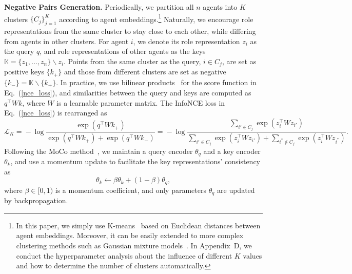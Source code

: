 \documentclass{article} %
\begin{document}
\textbf{Negative Pairs Generation.}
Periodically, we partition all $n$ agents into $K$ clusters $\{C_j\}_{j=1}^K$ according to agent embeddings.\footnote{In this paper, we simply use K-means~\citep{hartigan1979algorithm} based on Euclidean distances between agent embeddings.
Moreover, it can be easily extended to more complex clustering methods such as Gaussian mixture models~\citep{bishop2006pattern}.
In Appendix~D, we conduct the hyperparameter analysis about the influence of different $K$ values and how to determine the number of clusters automatically.}
Naturally, we encourage role representations from the same cluster to stay close to each other, while differing from agents in other clusters.
For agent $i$, we denote its role representation $z_i$ as the query $q$, and role representations of other agents as the keys $\mathbb{K}=\{z_1,...,z_n\}\backslash z_i$.
Points from the same cluster as the query, $i\in C_j$, are set as positive keys $\{k_+\}$ and those from different clusters are set as negative $\{k_-\} = \mathbb{K}\backslash \{k_+\}$.
In practice, we use bilinear products~\citep{laskin2020curl} for the score function in Eq.~(\ref{nce_loss}), and similarities between the query and keys are computed as $q^\top W k$, where $W$ is a learnable parameter matrix.
The InfoNCE loss in Eq.~(\ref{nce_loss}) is rearranged as 
\begin{equation}
    \mathcal{L}_K \!=\!-\log \frac{\exp(q^\top W k_+)}{\exp(q^\top Wk_+)+\exp(q^\top Wk_-)} \!=\! -\log \frac{\sum\nolimits_{i'\in C_j}\exp(z_i^\top Wz_{i'})}{\sum\limits_{i'\in C_j}\!\!\!\exp(z_i^\top Wz_{i'})\!+\!\!\!\sum\limits_{i^*\notin C_j}\!\!\!\exp(z_i^\top Wz_{i^*})}.
\label{nce_loss2}
\end{equation}
Following the MoCo method~\citep{he2020momentum}, we maintain a query encoder $\theta_q$ and a key encoder $\theta_k$, and use a momentum update to facilitate the key representations' consistency as
\begin{equation}\label{soft_update}
    \theta_k \gets \beta \theta_k + (1-\beta) \theta_q,
\end{equation}
where $\beta \!\in\! [0,1)$ is a momentum coefficient, and only parameters $\theta_q$ are updated by backpropagation.
\end{document}
